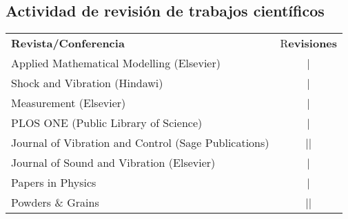 \subsection{Actividad de revisión de trabajos científicos}
\begin{tabular}{l c}
    \textbf{Revista/Conferencia} & R\textbf{evisiones} \\
    Applied Mathematical Modelling (Elsevier) & | \\ 
    Shock and Vibration (Hindawi) &  | \\
    Measurement (Elsevier) &  | \\
    PLOS ONE (Public Library of Science) & | \\
    Journal of Vibration and Control (Sage Publications) & || \\
    Journal of Sound and Vibration (Elsevier) & \cancel{||||} | \\
    Papers in Physics & | \\
    Powders \& Grains & || \\
\end{tabular}


